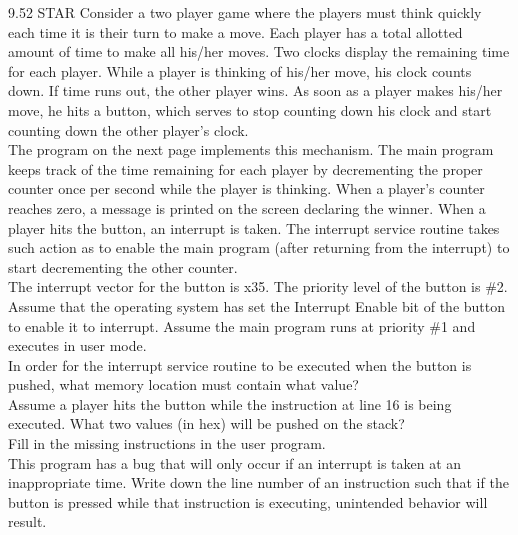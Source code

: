 \documentclass{patt}
\begin{document}
\begin{exercises}
\item[9.52]STAR Consider a two player game where the players must think quickly
each time it is their turn to make a move.  Each player has a total allotted
amount of time to make all his/her moves.  Two clocks display the remaining
time for each player.  While a player is thinking of his/her move, his clock
counts down.  If time runs out, the other player wins.  As soon as a player
makes his/her move, he hits a button, which serves to stop counting down his
clock and start counting down the other player's clock. \\

\noindent
The program on the next page implements this mechanism.  The main program keeps
track of the time remaining for each player by decrementing the proper counter
once per second while the player is thinking.  When a player's counter reaches
zero, a message is printed on the screen declaring the winner.  When a player
hits the button, an interrupt is taken.  The interrupt service routine takes
such action as to enable the main program (after returning from the interrupt)
to start decrementing the other counter. \\

\noindent
The interrupt vector for the button is x35.  The priority level of the button
is \#2.  Assume that the operating system has set the Interrupt Enable bit of the button to enable it to interrupt.  Assume the main program runs at priority \#1 and executes in user mode. \\

\noindent
In order for the interrupt service routine to be executed when
the button is pushed, what memory location must contain what value? \\

\vspace{.15in}
\noindent
Assume a player hits the button while the instruction at line 16
is being executed.  What two values (in hex) will be pushed on the stack? \\

\vspace{.15in}
\noindent
Fill in the missing instructions in the user program. \\

\noindent
This program has a bug that will only occur if an interrupt is taken at an inappropriate time. Write down the line number of an instruction such that if the button is pressed while that instruction is executing, unintended behavior will result.
\\


\end{exercises}
\end{document}
